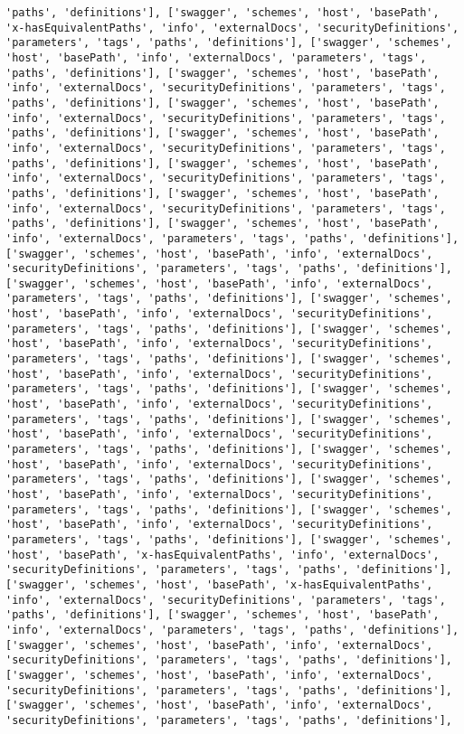 \documentclass[11pt]{article}
\begin{document}
\begin{Verbatim}[commandchars=\\\{\}]
'paths', 'definitions'], ['swagger', 'schemes', 'host', 'basePath', 'x-hasEquivalentPaths', 'info', 'externalDocs', 'securityDefinitions', 'parameters', 'tags', 'paths', 'definitions'], ['swagger', 'schemes', 'host', 'basePath', 'info', 'externalDocs', 'parameters', 'tags', 'paths', 'definitions'], ['swagger', 'schemes', 'host', 'basePath', 'info', 'externalDocs', 'securityDefinitions', 'parameters', 'tags', 'paths', 'definitions'], ['swagger', 'schemes', 'host', 'basePath', 'info', 'externalDocs', 'securityDefinitions', 'parameters', 'tags', 'paths', 'definitions'], ['swagger', 'schemes', 'host', 'basePath', 'info', 'externalDocs', 'securityDefinitions', 'parameters', 'tags', 'paths', 'definitions'], ['swagger', 'schemes', 'host', 'basePath', 'info', 'externalDocs', 'securityDefinitions', 'parameters', 'tags', 'paths', 'definitions'], ['swagger', 'schemes', 'host', 'basePath', 'info', 'externalDocs', 'securityDefinitions', 'parameters', 'tags', 'paths', 'definitions'], ['swagger', 'schemes', 'host', 'basePath', 'info', 'externalDocs', 'parameters', 'tags', 'paths', 'definitions'], ['swagger', 'schemes', 'host', 'basePath', 'info', 'externalDocs', 'securityDefinitions', 'parameters', 'tags', 'paths', 'definitions'], ['swagger', 'schemes', 'host', 'basePath', 'info', 'externalDocs', 'parameters', 'tags', 'paths', 'definitions'], ['swagger', 'schemes', 'host', 'basePath', 'info', 'externalDocs', 'securityDefinitions', 'parameters', 'tags', 'paths', 'definitions'], ['swagger', 'schemes', 'host', 'basePath', 'info', 'externalDocs', 'securityDefinitions', 'parameters', 'tags', 'paths', 'definitions'], ['swagger', 'schemes', 'host', 'basePath', 'info', 'externalDocs', 'securityDefinitions', 'parameters', 'tags', 'paths', 'definitions'], ['swagger', 'schemes', 'host', 'basePath', 'info', 'externalDocs', 'securityDefinitions', 'parameters', 'tags', 'paths', 'definitions'], ['swagger', 'schemes', 'host', 'basePath', 'info', 'externalDocs', 'securityDefinitions', 'parameters', 'tags', 'paths', 'definitions'], ['swagger', 'schemes', 'host', 'basePath', 'info', 'externalDocs', 'securityDefinitions', 'parameters', 'tags', 'paths', 'definitions'], ['swagger', 'schemes', 'host', 'basePath', 'info', 'externalDocs', 'securityDefinitions', 'parameters', 'tags', 'paths', 'definitions'], ['swagger', 'schemes', 'host', 'basePath', 'info', 'externalDocs', 'securityDefinitions', 'parameters', 'tags', 'paths', 'definitions'], ['swagger', 'schemes', 'host', 'basePath', 'x-hasEquivalentPaths', 'info', 'externalDocs', 'securityDefinitions', 'parameters', 'tags', 'paths', 'definitions'], ['swagger', 'schemes', 'host', 'basePath', 'x-hasEquivalentPaths', 'info', 'externalDocs', 'securityDefinitions', 'parameters', 'tags', 'paths', 'definitions'], ['swagger', 'schemes', 'host', 'basePath', 'info', 'externalDocs', 'parameters', 'tags', 'paths', 'definitions'], ['swagger', 'schemes', 'host', 'basePath', 'info', 'externalDocs', 'securityDefinitions', 'parameters', 'tags', 'paths', 'definitions'], ['swagger', 'schemes', 'host', 'basePath', 'info', 'externalDocs', 'securityDefinitions', 'parameters', 'tags', 'paths', 'definitions'], ['swagger', 'schemes', 'host', 'basePath', 'info', 'externalDocs', 'securityDefinitions', 'parameters', 'tags', 'paths', 'definitions'], 
\end{Verbatim}
\end{document}
